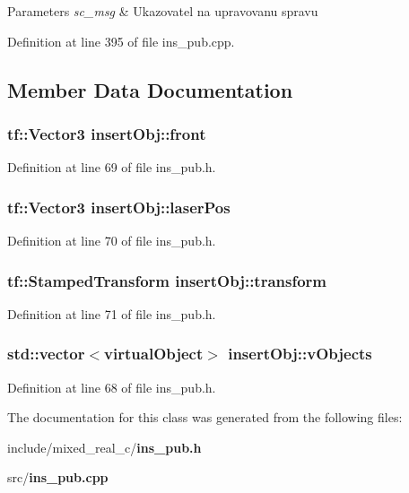 \begin{DoxyParams}{Parameters}
{\em sc\_\-msg} & Ukazovatel na upravovanu spravu \\
\hline
\end{DoxyParams}


Definition at line 395 of file ins\_\-pub.cpp.



\subsection{Member Data Documentation}
\subsubsection[{front}]{\setlength{\rightskip}{0pt plus 5cm}tf::Vector3 {\bf insertObj::front}\hspace{0.3cm}{\ttfamily  [private]}}\label{classinsertObj_a44513d0ad67e585997cd2a9ecee23872}


Definition at line 69 of file ins\_\-pub.h.

\subsubsection[{laserPos}]{\setlength{\rightskip}{0pt plus 5cm}tf::Vector3 {\bf insertObj::laserPos}\hspace{0.3cm}{\ttfamily  [private]}}\label{classinsertObj_a51ae3575c9c8582e3cebfce2933a66fb}


Definition at line 70 of file ins\_\-pub.h.

\subsubsection[{transform}]{\setlength{\rightskip}{0pt plus 5cm}tf::StampedTransform {\bf insertObj::transform}\hspace{0.3cm}{\ttfamily  [private]}}\label{classinsertObj_a5ee7e4a6cceb58b0eb65b00f2e2e7b5e}


Definition at line 71 of file ins\_\-pub.h.

\subsubsection[{vObjects}]{\setlength{\rightskip}{0pt plus 5cm}std::vector$<${\bf virtualObject}$>$ {\bf insertObj::vObjects}\hspace{0.3cm}{\ttfamily  [private]}}\label{classinsertObj_a8eb9b78d63dde25f040707798b32aa30}


Definition at line 68 of file ins\_\-pub.h.



The documentation for this class was generated from the following files:\begin{DoxyCompactItemize}
\item 
include/mixed\_\-real\_\-c/{\bf ins\_\-pub.h}\item 
src/{\bf ins\_\-pub.cpp}\end{DoxyCompactItemize}
